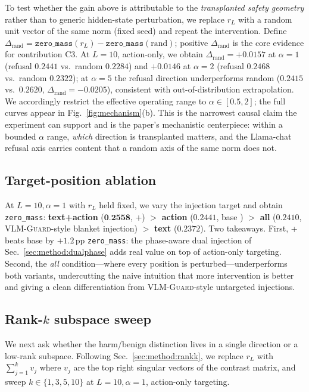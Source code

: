 To test whether the gain above is attributable to the \emph{transplanted safety geometry} rather than to generic hidden-state perturbation, we replace $r_L$ with a random unit vector of the same norm (fixed seed) and repeat the intervention. Define $\Delta_{\text{rand}} = \texttt{zero\_mass}(r_L) - \texttt{zero\_mass}(\text{rand})$; positive $\Delta_{\text{rand}}$ is the core evidence for contribution C3. At $L{=}10$, action-only, we obtain $\Delta_{\text{rand}} = +0.0157$ at $\alpha{=}1$ (refusal $0.2441$ vs.\ random $0.2284$) and $+0.0146$ at $\alpha{=}2$ (refusal $0.2468$ vs.\ random $0.2322$); at $\alpha{=}5$ the refusal direction underperforms random ($0.2415$ vs.\ $0.2620$, $\Delta_{\text{rand}}{=}-0.0205$), consistent with out-of-distribution extrapolation. We accordingly restrict the effective operating range to $\alpha \in [0.5, 2]$; the full curves appear in Fig.~\ref{fig:mechanism}(b). This is the narrowest causal claim the experiment can support and is the paper's mechanistic centerpiece: within a bounded $\alpha$ range, \emph{which} direction is transplanted matters, and the Llama-chat refusal axis carries content that a random axis of the same norm does not.

\subsection{Target-position ablation}
\label{sec:exp:target}

At $L{=}10, \alpha{=}1$ with $r_L$ held fixed, we vary the injection target and obtain \texttt{zero\_mass}: \textbf{text+action} ($\textbf{0.2558}$, \method{}+) $>$ \textbf{action} ($0.2441$, base \method{}) $>$ \textbf{all} ($0.2410$, \textsc{VLM-Guard}-style blanket injection) $>$ \textbf{text} ($0.2372$). Two takeaways. First, \method{}+ beats base \method{} by $+1.2$\,pp \texttt{zero\_mass}: the phase-aware dual injection of Sec.~\ref{sec:method:dualphase} adds real value on top of action-only targeting. Second, the \emph{all} condition---where every position is perturbed---underperforms both \method{} variants, undercutting the naive intuition that more intervention is better and giving a clean differentiation from \textsc{VLM-Guard}-style untargeted injections.

\subsection{Rank-$k$ subspace sweep}
\label{sec:exp:rankk}

We next ask whether the harm/benign distinction lives in a single direction or a low-rank subspace. Following Sec.~\ref{sec:method:rankk}, we replace $r_L$ with $\sum_{j=1}^{k} v_j$ where $v_j$ are the top right singular vectors of the contrast matrix, and sweep $k \in \{1,3,5,10\}$ at $L{=}10, \alpha{=}1$, action-only targeting.

